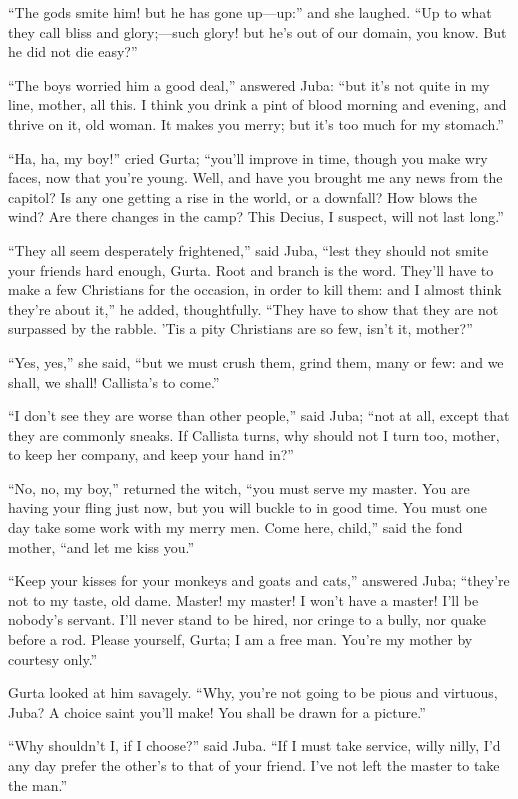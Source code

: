 ``The gods smite him! but he has gone up—up:'' and she
laughed. ``Up to what they call bliss and glory;—such glory! but
he's out of our domain, you know. But he did not die easy?''

``The boys worried him a good deal,'' answered Juba:
``but it's not quite in my line, mother, all this. I think you
drink a pint of blood morning and evening, and thrive on it, old
woman. It makes you merry; but it's too much for my stomach.''

``Ha, ha, my boy!'' cried Gurta; ``you'll improve in
time, though you make wry faces, now that you're young. Well, and have
you brought me any news from the capitol? Is any one getting a rise in
the world, or a downfall? How blows the wind? Are there changes in the
camp? This Decius, I suspect, will not last long.''

``They all seem desperately frightened,'' said Juba,
``lest they should not smite your friends hard enough, Gurta. Root
and branch is the word. They'll have to make a few Christians for the
occasion, in order to kill them: and I almost think they're about
it,'' he added, thoughtfully. ``They have to show that they
are not surpassed by the rabble. 'Tis a pity Christians are so few,
isn't it, mother?''

``Yes, yes,'' she said, ``but we must crush them, grind
them, many or few: and we shall, we shall! Callista's to come.''

``I don't see they are worse than other people,'' said
Juba; ``not at all, except that they are commonly sneaks. If
Callista turns, why should not I turn too, mother, to keep her
company, and keep your hand in?''

``No, no, my boy,'' returned the witch, ``you must
serve my master. You are having your fling just now, but you will
buckle to in good time. You must one day take some work with my merry
men. Come here, child,'' said the fond mother, ``and let me
kiss you.''

``Keep your kisses for your monkeys and goats and cats,''
answered Juba; ``they're not to my taste, old dame. Master! my
master! I won't have a master! I'll be nobody's servant. I'll never
stand to be hired, nor cringe to a bully, nor quake before a rod.
Please yourself, Gurta; I am a free man. You're my mother by courtesy
only.''

Gurta looked at him savagely. ``Why, you're not going to be
pious and virtuous, Juba? A choice saint you'll make! You shall be
drawn for a picture.''

``Why shouldn't I, if I choose?'' said Juba. ``If I
must take service, willy nilly, I'd any day prefer the other's to that
of your friend. I've not left the master to take the man.''


